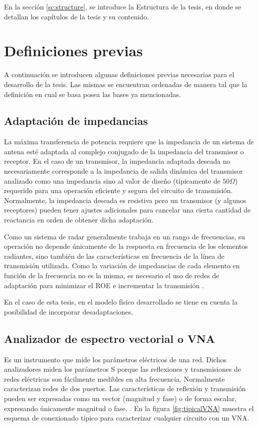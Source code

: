 En la sección \ref{sc:structure}, se introduce la Estructura de la tesis, en donde se detallan los capítulos de la tesis y su
contenido.


\section{Definiciones previas} \label{sc:definitions}

A continuación se introducen algunas definiciones previas necesarias para el desarrollo de la tesis. Las mismas se encuentran
ordenadas de manera tal que la definición en cual se basa posea las bases ya mencionadas.


\subsection{Adaptación de impedancias}
La máxima transferencia de potencia requiere que la impedancia de un sistema de antena esté adaptada al complejo conjugado de la
impedancia del transmisor o receptor. En el caso de un transmisor, la impedancia adaptada deseada no necesariamente corresponde a
la impedancia de salida dinámica del transmisor analizado como una impedancia sino al valor de diseño (típicamente de
$50 \Omega$) requerido para una operación eficiente y segura del circuito de transmisión. Normalmente, la impedancia deseada es
resistiva pero un transmisor (y algunos receptores) pueden tener ajustes adicionales para cancelar una cierta cantidad de
reactancia en orden de obtener dicha adaptación.

Como un sistema de radar generalmente trabaja en un rango de frecuencias, su operación no depende únicamente de la respuesta en
frecuencia de los elementos radiantes, sino también de las características en frecuencia de la línea de transmisión utilizada.
Como la variación de impedancias de cada elemento en función de la frecuencia no es la misma, es necesario el uso de redes de
adaptación para minimizar el ROE e incrementar la transmisión \cite{Balanis2012}.

En el caso de esta tesis, en el modelo físico desarrollado se tiene en cuenta la posibilidad de incorporar desadaptaciones.


\subsection{Analizador de espectro vectorial o VNA}

Es un instrumento que mide los parámetros eléctricos de una red. Dichos analizadores miden los parámetros S porque las
reflexiones y transmisiones de redes eléctricas son fácilmente medibles en alta frecuencia. Normalmente caracterizan redes de
dos puertos. Las características de reflexión y transmisión pueden ser expresadas como un vector (magnitud y fase) o de forma
escalar, expresando únicamente magnitud o fase. \cite{AgilentTechnologies2012}. En la figura \ref{fig:tipicalVNA} muestra el
esquema de conexionado típico para caracterizar cualquier circuito con un VNA.

